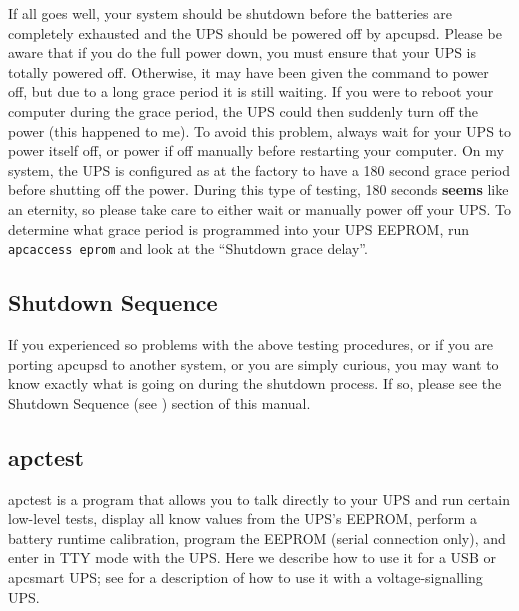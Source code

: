 {{{{If all goes well, your system should be shutdown before the batteries are
completely exhausted and the UPS should be powered off by apcupsd. Please be
aware that if you do the full power down, you must ensure that your UPS is
totally powered off.  Otherwise, it may have been given the command to power
off, but due to a long grace period it is still waiting. If you were to reboot
your computer during the grace period, the UPS could then suddenly turn off
the power (this happened to me). To avoid this problem, always wait for your
UPS to power itself off, or power if off manually before restarting your
computer. On my system, the UPS is configured as at the factory to have a 180
second grace period before shutting off the power. During this type of
testing, 180 seconds {\bf seems} like an eternity, so please take care to
either wait or manually power off your UPS. To determine what grace period is
programmed into your UPS EEPROM, run {\tt apcaccess eprom} and look at the
``Shutdown grace delay''. 

\label{Shutdown-Sequence}

\subsection*{Shutdown Sequence}

\label{index-Shutdown-Sequence-99}
If you experienced so problems with the above testing procedures, or if you
are porting apcupsd to another system, or you are simply curious, you may want
to know exactly what is going on during the shutdown process. If so, please
see the Shutdown Sequence (see 
) section of this
manual. 

\label{apctest}

\subsection*{apctest}

\label{index-apctest-100}
apctest is a program that allows you to talk directly to your UPS and run
certain low-level tests, display all know values from the UPS's EEPROM,
perform a battery runtime calibration, program the EEPROM (serial connection
only), and enter in TTY mode with the UPS. Here we describe how to use it for
a USB or apcsmart UPS; see 
 for a description
of how to use it with a voltage-signalling UPS.  

}}}}
